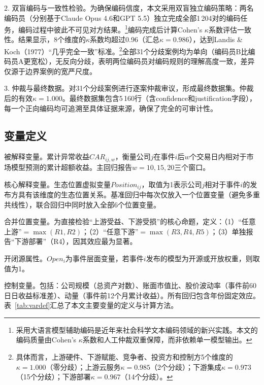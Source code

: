 \documentclass[11pt,fontset=fandol,a4paper]{ctexart}
\newcommand{\changed}[1]{{\color{orange!85!black}#1}}
\begin{document}
\changed{2. 双盲编码与一致性检验。为确保编码信度，本文采用双盲独立编码策略：两名编码员（分别基于Claude Opus 4.6和GPT 5.5）独立完成全部1\,204对的编码任务，编码过程中彼此不可见对方结果。\footnote{采用大语言模型辅助编码是近年来社会科学文本编码领域的新兴实践。本文的编码质量由Cohen's $\kappa$系数和人工仲裁双重保障，而非依赖单一模型输出。}编码完成后计算Cohen's $\kappa$系数评估一致性。结果显示，8个维度的$\kappa$系数均超过0.96（汇总$\kappa=0.986$），达到Landis \& Koch（1977）“几乎完全一致”标准。\footnote{具体而言，上游硬件、下游赋能、竞争者、投资方和控制方5个维度的$\kappa=1.000$（零分歧）；上游云服务$\kappa=0.985$（2个分歧）；下游集成$\kappa=0.973$（15个分歧）；下游部署$\kappa=0.967$（14个分歧）。}全部31个分歧案例均为单向（编码员B比编码员A更宽松），无反向分歧，表明两位编码员对编码规则的理解高度一致，差异仅源于边界案例的宽严尺度。}

3. 仲裁与最终数据。对31个分歧案例进行逐案仲裁审议，形成最终数据集。仲裁后的有效$\kappa=1.000$。最终数据集包含5\,160行（含confidence和justification字段），每一个正向编码均可追溯至具体证据来源，确保了完全的可审计性。

\subsection{变量定义}

被解释变量。累计异常收益$CAR_{ij,w}$，衡量公司$j$在事件$i$后$w$个交易日内相对于市场模型预测的累计超额收益。主回归报告$w=10,15,20$三个窗口。

核心解释变量。生态位置虚拟变量$Position_{ij}$，取值为1表示公司$j$相对于事件$i$的发布方具有该维度的生态位置关系。基准回归中每次仅放入一个位置变量（避免多重共线性），联合回归中同时放入全部6个位置变量。

\changed{合并位置变量。为直接检验“上游受益、下游受损”的核心命题，定义：（1）“任意上游”$=\max(R1,R2)$；（2）“任意下游”$=\max(R3,R4,R5)$；（3）单独报告“下游部署”（R4），因其效应最为显著。}

开闭源属性。$Open_i$为事件层面变量，若事件$i$发布的模型为开源或开放权重，则取值为1。

控制变量。包括：公司规模（总资产对数）、账面市值比、股价波动率（事件前60日日收益标准差）、动量（事件前12个月累计收益）。所有回归包含年份固定效应。表~\ref{tab:vardef}汇总了本文主要变量的定义与计算方法。
\end{document}
